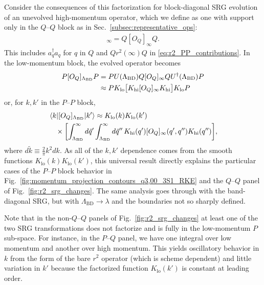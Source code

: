 \documentclass[10pt,aps,prc,floatfix,twocolumn,nofootinbib]{revtex4-1}
\newcommand{\LambdaBD}{{\Lambda_{\text{BD}}}}
\newcommand{\ataq}{a^{\dagger}_q a_q}
\newcommand{\Klo}{K_{\text{lo}}}
\newcommand{\Khi}{K_{\text{hi}}}
\newcommand{\PP}{\ensuremath{P\mbox{--}P}}
\newcommand{\PQ}{\ensuremath{P\mbox{--}Q}}
\newcommand{\QQ}{\ensuremath{Q\mbox{--}Q}}
\begin{document}
Consider the consequences of this factorization for block-diagonal SRG evolution of an unevolved high-momentum operator, which we define as one with support only in the $\QQ$ block as in Sec.~\ref{subsec:representative_ops}:
%
\begin{align}
    [O_Q]_\infty = Q [O_Q]_\infty Q.
\end{align}
%
This includes $\ataq$ for $q$ in $Q$ and $Qr^2(\infty)Q$ in \eqref{eq:r2_PP_contributions}.
In the low-momentum block, the evolved operator becomes
%
\begin{align}
    P [O_Q]_\LambdaBD P &=
      P U(\LambdaBD)Q[O_Q]_\infty Q U^\dagger(\LambdaBD) P \notag \\
      &\approx P \Klo \bigl[\Khi [O_Q]_\infty \Khi\bigr] \Klo P
\end{align}
%
or, for $k,k'$ in the $\PP$ block,
%
\begin{align} \label{eq:factored_op}
   & \mel{k}{[O_Q]_\LambdaBD}{k'} \approx 
        \Klo(k) \Klo(k') \notag \\
  &  \quad \times
     \biggl[
      \int_{\LambdaBD}^{\infty} d\tilde{q}' 
      \int_{\LambdaBD}^{\infty} d\tilde{q}''\, \Khi(q') [O_Q]_\infty(q',q'') \Khi(q'')
     \biggr],
\end{align}
%
where $d\tilde{k} \equiv \frac{2}{\pi} k^2 dk$.
As all of the $k,k'$ dependence comes from the smooth functions $\Klo(k)\Klo(k')$, this universal result directly explains the particular cases of the $\PP$ block behavior in Fig.~\ref{fig:momentum_projection_contours_q3,00_3S1_RKE} and the $\QQ$ panel of Fig.~\ref{fig:r2_srg_changes}.
The same analysis goes through with the band-diagonal SRG, but with $\LambdaBD \rightarrow \lambda$ and the boundaries not so sharply defined.


Note that in the non-$\QQ$ panels of Fig.~\ref{fig:r2_srg_changes} at least one of the two SRG transformations does not factorize and is fully in the low-momentum $P$ sub-space.
For instance, in the $\PQ$ panel, we have one integral over low momentum and another over high momentum.
This yields oscillatory behavior in $k$ from the form of the bare $r^2$ operator (which is scheme dependent) and little variation in $k'$ because the factorized function $\Klo(k')$ is constant at leading order.
\end{document}
